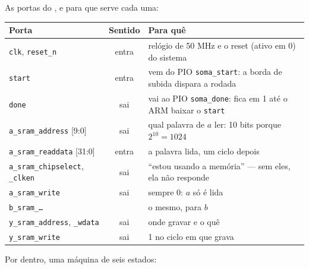 \documentclass[11pt,a4paper,oneside]{article}
\newcommand{\arq}[1]{{\upshape\ttfamily\detokenize{#1}}}
\begin{document}
As portas do \arq{soma.v}, e para que serve cada uma:

\begin{center}\small
\begin{tabularx}{\linewidth}{@{}>{\raggedright}p{4.1cm}cX@{}}
\toprule
\textbf{Porta} & \textbf{Sentido} & \textbf{Para quê} \\
\midrule
\texttt{clk}, \texttt{reset\_n} & entra & relógio de 50 MHz e o reset (ativo em 0) do sistema \\ \addlinespace
\texttt{start} & entra & vem do PIO \texttt{soma\_start}: a borda de subida dispara a rodada \\ \addlinespace
\texttt{done} & sai & vai ao PIO \texttt{soma\_done}: fica em 1 até o ARM baixar o \texttt{start} \\ \addlinespace
\texttt{a\_sram\_address} [9:0] & sai & qual palavra de \(a\) ler: 10 bits porque \(2^{10} = 1024\) \\
\texttt{a\_sram\_readdata} [31:0] & entra & a palavra lida, um ciclo depois \\
\texttt{a\_sram\_chipselect}, \texttt{\_clken} & sai & ``estou usando a memória'' --- sem eles, ela não responde \\
\texttt{a\_sram\_write} & sai & sempre 0: \(a\) só é lida \\ \addlinespace
\texttt{b\_sram\_\ldots} & & o mesmo, para \(b\) \\ \addlinespace
\texttt{y\_sram\_address}, \texttt{\_wdata} & sai & onde gravar e o quê \\
\texttt{y\_sram\_write} & sai & 1 no ciclo em que grava \\
\bottomrule
\end{tabularx}
\end{center}

Por dentro, uma máquina de seis estados:

\begin{center}
\end{center}
\end{document}
